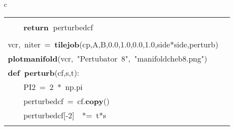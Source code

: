 \documentclass{article}\usepackage[]{graphicx}\usepackage[dvipsnames,table]{xcolor}
\makeatletter
\newcommand{\hlnum}[1]{\textcolor[rgb]{0.686,0.059,0.569}{#1}}%
\newcommand{\hlsng}[1]{\textcolor[rgb]{0.192,0.494,0.8}{#1}}%
\newcommand{\hlopt}[1]{\textcolor[rgb]{0,0,0}{#1}}%
\newcommand{\hldef}[1]{\textcolor[rgb]{0.345,0.345,0.345}{#1}}%
\newcommand{\hlkwa}[1]{\textcolor[rgb]{0.161,0.373,0.58}{\textbf{#1}}}%
\newcommand{\hlkwb}[1]{\textcolor[rgb]{0.69,0.353,0.396}{#1}}%
\newcommand{\hlkwd}[1]{\textcolor[rgb]{0.737,0.353,0.396}{\textbf{#1}}}%
\newenvironment{kframe}{%
 \def\at@end@of@kframe{}%
 \ifinner\ifhmode%
  \def\at@end@of@kframe{\end{minipage}}%
  \begin{minipage}{\columnwidth}%
 \fi\fi%
 \def\FrameCommand##1{\hskip\@totalleftmargin \hskip-\fboxsep
 \colorbox{shadecolor}{##1}\hskip-\fboxsep
     \hskip-\linewidth \hskip-\@totalleftmargin \hskip\columnwidth}%
 \MakeFramed {\advance\hsize-\width
   \@totalleftmargin\z@ \linewidth\hsize
   \@setminipage}}%
 {\par\unskip\endMakeFramed%
 \at@end@of@kframe}
\newenvironment{knitrout}{}{} %
\makeatother
\begin{document}
\begin{center}
\begin{tabular}{c}
\begin{tabular}{m{10cm}m{10cm}}
\begin{minipage}[m]{10cm}
\begin{knitrout}
\begin{kframe}
\hldef{}\hldef{\ \ \ \ }\hldef{perturbed\textunderscore cf}\hlopt{{[}}\hldef{}\hlnum{0}\hldef{}\hlopt{{]}\ {*}=\ (\ }\hldef{s\ }\hlopt{+\ }\hldef{}\hlnum{1}\hldef{j\ }\hlopt{{*}\ }\hldef{t\ }\hlopt{)}\hspace*{\fill}\\
\hldef{}\hldef{\ \ \ \ }\hldef{}\hlkwa{return\ }\hldef{perturbed\textunderscore cf}\hspace*{\fill}\\
\hldef{}\hspace*{\fill}\\
\hldef{vcr}\hlopt{,\ }\hldef{niter\ }\hlopt{=\ }\hldef{}\hlkwd{tile\textunderscore job}\hldef{}\hlopt{(}\hldef{cp}\hlopt{,}\hldef{A}\hlopt{,}\hldef{B}\hlopt{,}\hldef{}\hlnum{0.0}\hldef{}\hlopt{,}\hldef{}\hlnum{1.0}\hldef{}\hlopt{,}\hldef{}\hlnum{0.0}\hldef{}\hlopt{,}\hldef{}\hlnum{1.0}\hldef{}\hlopt{,}\hldef{side}\hlopt{{*}}\hldef{side}\hlopt{,}\hldef{perturb\textunderscore 8}\hlopt{)}\hspace*{\fill}\\
\hldef{}\hlkwd{plot\textunderscore manifold}\hldef{}\hlopt{(}\hldef{vcr}\hlopt{,\ }\hldef{}\hlsng{"Pertubator\ 8"}\hldef{}\hlopt{,\ }\hldef{}\hlsng{"manifold\textunderscore cheb8.png"}\hldef{}\hlopt{)}\hldef{}\hspace*{\fill}
\mbox{}
\normalfont
\end{kframe}
\end{knitrout}
\end{minipage}
&
\begin{minipage}[m]{10cm}
\begin{knitrout}\tiny
\definecolor{shadecolor}{rgb}{0.969, 0.969, 0.969}\color{fgcolor}\begin{kframe}
\noindent
\ttfamily
\hldef{}\hlkwb{@njit}\hspace*{\fill}\\
\hldef{}\hlkwa{def\ }\hldef{}\hlkwd{perturb\textunderscore 9}\hldef{}\hlopt{(}\hldef{cf}\hlopt{,}\hldef{s}\hlopt{,}\hldef{t}\hlopt{):}\hspace*{\fill}\\
\hldef{}\hldef{\ \ \ \ }\hldef{PI2\ }\hlopt{=\ }\hldef{}\hlnum{2\ }\hldef{}\hlopt{{*}\ }\hldef{np}\hlopt{.}\hldef{pi}\hspace*{\fill}\\
\hldef{}\hldef{\ \ \ \ }\hldef{perturbed\textunderscore cf\ }\hlopt{=\ }\hldef{cf}\hlopt{.}\hldef{}\hlkwd{copy}\hldef{}\hlopt{()}\hspace*{\fill}\\
\hldef{}\hldef{\ \ \ \ }\hldef{perturbed\textunderscore cf}\hlopt{{[}{-}}\hldef{}\hlnum{2}\hldef{}\hlopt{{]}}\hldef{\ \ }\hlopt{{*}=\ }\hldef{t}\hlopt{{*}}\hldef{s}\hspace*{\fill}\\

\end{kframe}
\end{knitrout}
\end{minipage}
\end{tabular}
\end{tabular}
\end{center}
\end{document}
